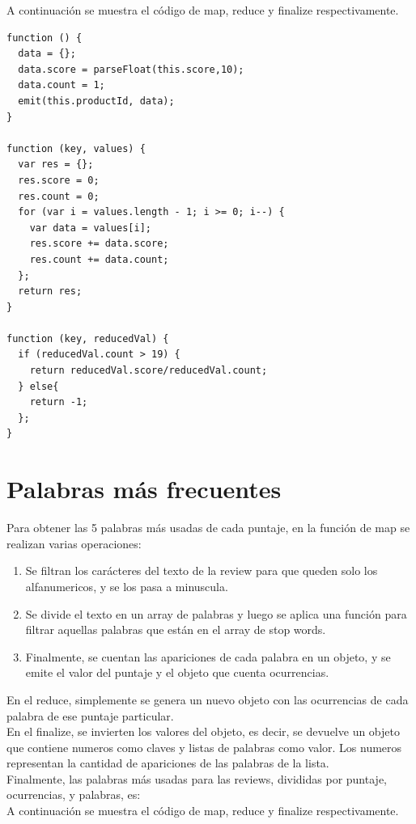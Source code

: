 \documentclass{article}
\begin{document}
A continuaci\'on se muestra el c\'odigo de map, reduce y finalize respectivamente.

\begin{lstlisting}
function () {
  data = {};
  data.score = parseFloat(this.score,10);
  data.count = 1;
  emit(this.productId, data);
}

function (key, values) {
  var res = {};
  res.score = 0;
  res.count = 0;
  for (var i = values.length - 1; i >= 0; i--) {
    var data = values[i];
    res.score += data.score;
    res.count += data.count;
  };
  return res;
}

function (key, reducedVal) {
  if (reducedVal.count > 19) {
    return reducedVal.score/reducedVal.count; 
  } else{
    return -1;
  };
}
\end{lstlisting}

\section{Palabras m\'as frecuentes}

 Para obtener las 5 palabras m\'as usadas de cada puntaje, en la funci\'on de map se realizan varias operaciones:

\begin{enumerate}
  \item Se filtran los car\'acteres del texto de la review para que queden solo los alfanumericos, y se los pasa a minuscula.

  \item Se divide el texto en un array de palabras y luego se aplica una funci\'on para filtrar aquellas palabras que est\'an en el array de stop words.

  \item Finalmente, se cuentan las apariciones de cada palabra en un objeto, y se emite el valor del puntaje y el objeto que cuenta ocurrencias.
\end{enumerate}

 En el reduce, simplemente se genera un nuevo objeto con las ocurrencias de cada palabra de ese puntaje particular.
\\ En el finalize, se invierten los valores del objeto, es decir, se devuelve un objeto que contiene numeros como claves y listas de palabras como valor. Los numeros representan la cantidad de apariciones de las palabras de la lista.
\\ Finalmente, las palabras m\'as usadas para las reviews, divididas por puntaje, ocurrencias, y palabras, es:
\\ A continuaci\'on se muestra el c\'odigo de map, reduce y finalize respectivamente.
\end{document}
